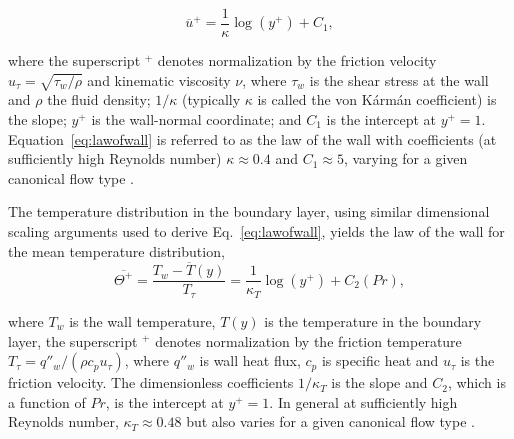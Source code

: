 \begin{equation}
{\overline u^+}=\frac{1}{\kappa}\log(y^+)+C_1, \label{eq:lawofwall}
\end{equation}

\noindent  where the superscript $^+$ denotes normalization by the friction velocity $u_\tau = \sqrt{\tau_w / \rho}$ and kinematic viscosity $\nu$, where $\tau_w$ is the shear stress at the wall and $\rho$ the fluid density; $1/\kappa$ (typically $\kappa$ is called the von K\'{a}rm\'{a}n coefficient) is the slope; $y^+$ is the wall-normal coordinate; and $C_1$ is the intercept at $y^+ = 1$. Equation~\ref{eq:lawofwall} is referred to as the law of the wall with coefficients (at sufficiently high Reynolds number) $\kappa\approx0.4$ and $C_1\approx5$, varying for a given canonical flow type \cite{Nagib2008}. 

The temperature distribution in the boundary layer, using similar dimensional scaling arguments used to derive Eq.~\ref{eq:lawofwall}, yields the law of the wall for the mean temperature distribution,
\begin{equation}
{\overline{\Theta^+ }} =  \frac{\overline{T_w - T(y)}}{T_\tau} =\frac{1}{\kappa_T}\log(y^+)+C_2(Pr), \label{eq:lawofwallT}
\end{equation}

\noindent \noindent  where $T_w$ is the wall temperature, $T(y)$ is the temperature in the boundary layer, the superscript $^+$ denotes normalization by the friction temperature $T_\tau = q''_w / (\rho c_p u_{\tau} )$, where $q''_w$ is wall heat  flux, $c_p$ is specific heat and $u_\tau$ is the friction velocity. The dimensionless coefficients $1/\kappa_T$ is the slope and $C_2$, which is a function of $Pr$, is the intercept at $y^+ = 1$. In general at sufficiently high Reynolds number, $\kappa_T \approx 0.48$ but also varies for a given canonical flow type \cite{kader1972}.

